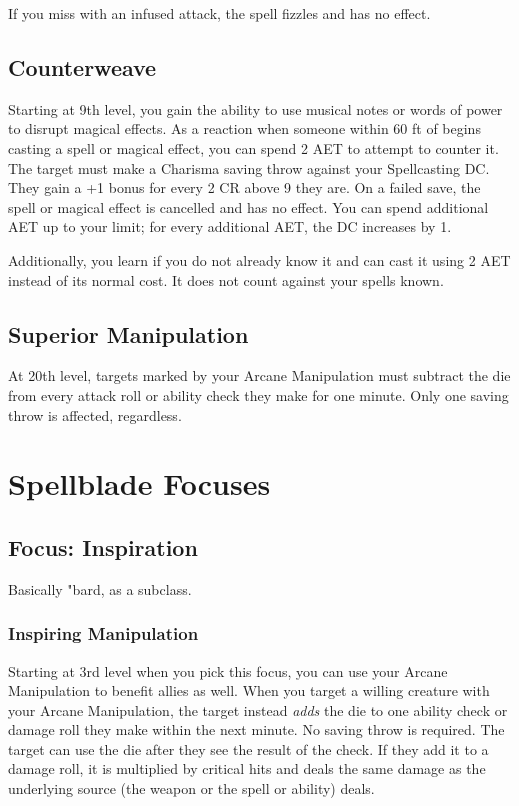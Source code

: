 If you miss with an infused attack, the spell fizzles and has no effect.

\subsection{Counterweave}

Starting at 9th level, you gain the ability to use musical notes or words of power to disrupt magical effects. As a reaction when someone within 60 ft of begins casting a spell or magical effect, you can spend 2 AET to attempt to counter it. The target must make a Charisma saving throw against your Spellcasting DC. They gain a +1 bonus for every 2 CR above 9 they are. On a failed save, the spell or magical effect is cancelled and has no effect. You can spend additional AET up to your limit; for every additional AET, the DC increases by 1.

Additionally, you learn \textit{} if you do not already know it and can cast it using 2 AET instead of its normal cost. It does not count against your spells known.

\subsection{Superior Manipulation}

At 20th level, targets marked by your Arcane Manipulation must subtract the die from every attack roll or ability check they make for one minute. Only one saving throw is affected, regardless.

\section{Spellblade Focuses}
\subsection{Focus: Inspiration}
Basically "bard, as a subclass.

\subsubsection{Inspiring Manipulation}
Starting at 3rd level when you pick this focus, you can use your Arcane Manipulation to benefit allies as well. When you target a willing creature with your Arcane Manipulation, the target instead \textit{adds} the die to one ability check or damage roll they make within the next minute. No saving throw is required. The target can use the die after they see the result of the check. If they add it to a damage roll, it is multiplied by critical hits and deals the same damage as the underlying source (the weapon or the spell or ability) deals.

